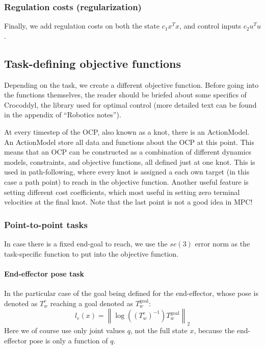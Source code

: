\documentclass{article}
\begin{document}
\subsubsection{Regulation costs (regularization)}
Finally, we add regulation costs on both the state $ c_{ 1 } x^{ T }x  $,
and control inputs $ c_{ 2 } u^{ T }u  $.

\subsection{Task-defining objective functions}
Depending on the task, we create a different objective function.
Before going into the functions themselves, the reader 
should be briefed about some specifics of Crocoddyl, the library
used for optimal control (more detailed text can be found in the appendix
of ``Robotics notes'').

At every timestep of the OCP, also known as a knot,
there is an ActionModel. An ActionModel store all data and functions
about the OCP at this point. This means that an OCP can be constructed
as a combination of different dynamics models, constraints, 
and objective functions, all defined just at one knot.
This is used in path-following, where every knot is assigned
a each own target (in this case a path point) to reach in the objective function.
Another useful feature is setting different cost coefficients,
which most useful in setting zero terminal velocities at the final knot.
Note that the last point is not a good idea in MPC!

\subsubsection{Point-to-point tasks}
In case there is a fixed end-goal to reach, we use the $se(3)$ error
norm as the task-specific function to put into the objective function.
\paragraph{End-effector pose task}
In the particular case of the goal being defined for the end-effector,
whose pose is denoted as $   T_{ w }^{ e }$ reaching a goal
denoted as $   T_{ w }^{ \text{goal} }$:
\begin{equation}
l_{ e } (x)= \left\lVert 
\log \left( \left( T_{ w }^{ e } \right)^{ -1 } \right) T_{ w }^{ \text{goal} }
\right \rVert _{ 2 }
\end{equation}
Here we of course use only joint values $ q  $, not the full state $ x  $,
because the end-effector pose is only a function of $ q  $.
\end{document}
